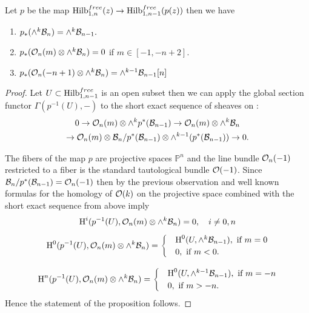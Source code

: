 \documentclass[10pt]{amsart}
\begin{document}
\begin{proposition}\label{prop: push forward} Let $p$ be the map $\mathrm{Hilb}^{free}_{1,n}(z)\to\mathrm{Hilb}^{free}_{1,n-1}(p(z))$ then we have
\begin{enumerate}
\item $p_*(\wedge^k\mathcal{B}_n)=\wedge^k\mathcal{B}_{n-1}.$
\item $p_*(\mathcal{O}_n(m)\otimes \wedge^k\mathcal{B}_n)=0$ if $m\in [-1,-n+2].$
\item $p_*(\mathcal{O}_n(-n+1)\otimes \wedge^k\mathcal{B}_n)=\wedge^{k-1}\mathcal{B}_{n-1}[n]$
\end{enumerate}
\end{proposition}
\begin{proof}
Let $U\subset \mathrm{Hilb}_{1,n-1}^{free}$ is an open subset then we can apply the global section functor $\Gamma(p^{-1}(U),-)$ to the short exact sequence of sheaves on :
\begin{multline*}
  0\to \mathcal{O}_n(m)\otimes\wedge^k p^*(\mathcal{B}_{n-1})\to \mathcal{O}_n(m)\otimes\wedge^k\mathcal{B}_n\\
  \to \mathcal{O}_n(m)\otimes\mathcal{B}_n/p^*(\mathcal{B}_{n-1})\otimes \wedge^{k-1}(p^*(\mathcal{B}_{n-1}))\to 0.
  \end{multline*}

The fibers of the map $p$ are projective spaces $\mathbb{P}^n$ and the line bundle $\mathcal{O}_n(-1)$ restricted to a fiber is the standard tautological bundle $\mathcal{O}(-1)$.
Since $\mathcal{B}_n/p^*(\mathcal{B}_{n-1})=\mathcal{O}_n(-1)$ then by the previous observation and well known formulas for the homology of $\mathcal{O}(k)$ on the projective space combined with the short exact sequence from above imply
 $$\textup{H}^i(p^{-1}(U),\mathcal{O}_n(m)\otimes\wedge^k\mathcal{B}_n)=0,\quad i\ne 0, n $$
 $$ \textup{H}^0(p^{-1}(U),\mathcal{O}_n(m)\otimes \wedge^k\mathcal{B}_n)=\begin{cases} &\textup{H}^0(U,\wedge^k\mathcal{B}_{n-1}),\mbox{ if } m=0\\
                                                                                                                                             & 0,\mbox{ if } m<0.
                                                                                                                    \end{cases}
                                                                                                                    $$

 $$ \textup{H}^n(p^{-1}(U),\mathcal{O}_n(m)\otimes \wedge^k\mathcal{B}_n)=\begin{cases} &\textup{H}^0(U,\wedge^{k-1}\mathcal{B}_{n-1}),\mbox{ if } m=-n\\
                                                                                                                                             & 0,\mbox{ if } m>-n.
                                                                                                                    \end{cases}
                                                                                                                    $$
 Hence the statement of the proposition follows.
\end{proof}
\end{document}
